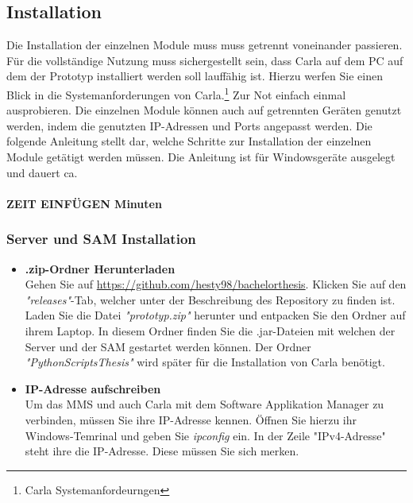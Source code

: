 \subsection{Installation}
Die Installation der einzelnen Module muss muss getrennt voneinander passieren. Für die vollständige Nutzung muss sichergestellt sein, dass Carla auf dem PC auf dem der Prototyp installiert werden soll lauffähig ist. Hierzu werfen Sie einen Blick in die Systemanforderungen von Carla.\footnote{Carla Systemanfordeurngen} Zur Not einfach einmal ausprobieren. Die einzelnen Module können auch auf getrennten Geräten genutzt werden, indem die genutzten IP-Adressen und Ports angepasst werden. Die folgende Anleitung stellt dar, welche Schritte zur Installation der einzelnen Module getätigt werden müssen. Die Anleitung ist für Windowsgeräte ausgelegt und dauert ca. \\
\\
\textbf{ZEIT EINFÜGEN Minuten}


\subsubsection{Server und SAM Installation}
\begin{itemize}
	\item[\textbf{1.}] \textbf{.zip-Ordner Herunterladen}\\
	Gehen Sie auf \url{https://github.com/hesty98/bachelorthesis}. Klicken Sie auf den \textit{"releases"}-Tab, welcher unter der Beschreibung des Repository zu finden ist.
	Laden Sie die Datei \textit{"prototyp.zip"} herunter und entpacken Sie den Ordner auf ihrem Laptop. In diesem Ordner finden Sie die .jar-Dateien mit welchen der Server und der SAM gestartet werden können. Der Ordner \textit{"PythonScriptsThesis"} wird später für die Installation von Carla benötigt.
	
	\item[\textbf{2.}] \textbf{IP-Adresse aufschreiben}\\
	Um das MMS und auch Carla mit dem Software Applikation Manager zu verbinden, müssen Sie ihre IP-Adresse kennen. Öffnen Sie hierzu ihr Windows-Temrinal und geben Sie \textit{ipconfig} ein. In der Zeile "IPv4-Adresse" steht ihre die IP-Adresse. Diese müssen Sie sich merken.
\end{itemize}



